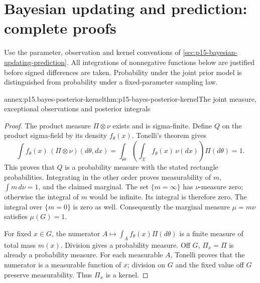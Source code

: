 \section{Bayesian updating and prediction: complete proofs}
\label{sec:annex-p15-bayesian-updating-prediction}

Use the parameter, observation and kernel conventions of
\cref{sec:p15-bayesian-updating-prediction}. All integrations of
nonnegative functions below are justified before signed differences
are taken. Probability under the joint prior model is distinguished
from probability under a fixed-parameter sampling law.

\begin{annexitem}{annex:p15.bayes-posterior-kernel}{thm:p15-bayes-posterior-kernel}{The joint measure, exceptional observations and posterior integrals}
\begin{proof}
The product measure \(\Pi\otimes\nu\) exists and is sigma-finite.
Define \(Q\) on the product sigma-field by its density
\(f_\theta(x)\). Tonelli's theorem gives
\[
 \int f_\theta(x)\,(\Pi\otimes\nu)(d\theta,dx)
   =\int_\Theta\left(\int_{\mathcal X}f_\theta(x)\,\nu(dx)\right)
                                                    \Pi(d\theta)=1.
\]
This proves that \(Q\) is a probability measure with the stated
rectangle probabilities. Integrating in the other order proves
measurability of \(m\), \(\int m\,d\nu=1\), and the claimed marginal.
The set \(\{m=\infty\}\) has \(\nu\)-measure zero; otherwise the
integral of \(m\) would be infinite. Its integral is therefore zero.
The integral over \(\{m=0\}\) is zero as well. Consequently
the marginal measure \(\mu=m\nu\) satisfies \(\mu(G)=1\).

For fixed \(x\in G\), the numerator
\(A\mapsto\int_A f_\theta(x)\Pi(d\theta)\) is a finite
measure of total mass \(m(x)\). Division gives a probability measure.
Off \(G\), \(\Pi_x=\Pi\) is already a probability measure.
For each measurable \(A\), Tonelli proves that the numerator is
a measurable function of \(x\); division on \(G\) and the fixed
value off \(G\) preserve measurability. Thus \(\Pi_x\) is a kernel.


\end{proof}
\end{annexitem}
